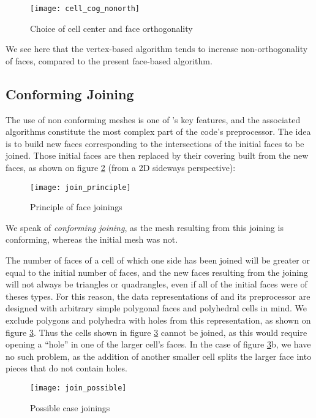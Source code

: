 \begin{figure}[!h]
\centerline{
\texttt{[image: cell\_cog\_nonorth]}}
\caption{Choice of cell center and face orthogonality}
\label{fig:algo.cog_cel.nonorth}
\end{figure}

We see here that the vertex-based algorithm tends to increase
non-orthogonality of faces, compared to the present
face-based algorithm.

\subsection*{Conforming Joining\label{sec:join}}

The use of non conforming meshes is one of \CS's key features, and
the associated algorithms constitute the most complex part of the
code's preprocessor. The idea is to build new faces corresponding to
the intersections of the initial faces to be joined.
Those initial faces are then replaced by their covering built
from the new faces, as shown on figure \ref{fig:algo.join.principle}
(from a 2D sideways perspective):

\begin{figure}[!h]
\centerline{
\texttt{[image: join\_principle]}}
\caption{Principle of face joinings}
\label{fig:algo.join.principle}
\end{figure}

We speak of \emph{conforming joining}, as the mesh resulting from
this joining is conforming, whereas the initial mesh was not.

The number of faces of a cell of which one side has been joined will
be greater or equal to the initial number of faces, and the new faces
resulting from the joining will not always be triangles or quadrangles,
even if all of the initial faces were of theses types. For this
reason, the data representations of \CS and its preprocessor
are designed with arbitrary simple polygonal faces and polyhedral
cells in mind. We exclude polygons and polyhedra with holes from
this representation, as shown on figure \ref{fig:algo.join.possible}.
Thus the cells shown in figure \ref{fig:algo.join.possible} cannot be
joined, as this would require opening a ``hole'' in one of the larger
cell's faces. In the case of figure \ref{fig:algo.join.possible}b, we
have no such problem, as the addition of another smaller cell
splits the larger face into pieces that do not contain holes.

\begin{figure}[!h]
\centerline{
\texttt{[image: join\_possible]}}
\caption{Possible case joinings}
\label{fig:algo.join.possible}
\end{figure}

